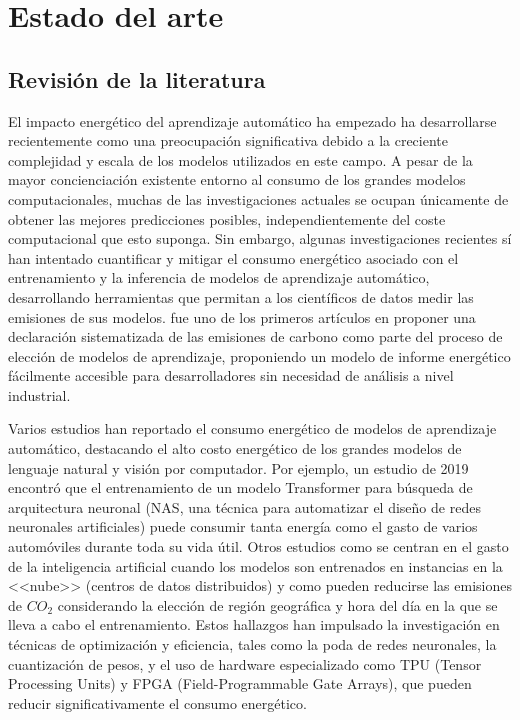 \chapter{Estado del arte}
\label{chap:sota}

\section{Revisión de la literatura}
\label{sec:lit-rev}


El impacto energético del aprendizaje automático ha empezado ha desarrollarse recientemente como una preocupación significativa debido a la creciente complejidad y escala de los modelos utilizados en este campo. A pesar de la mayor concienciación existente entorno al consumo de los grandes modelos computacionales, muchas de las investigaciones actuales se ocupan únicamente de obtener las mejores predicciones posibles, independientemente del coste computacional que esto suponga. Sin embargo, algunas investigaciones recientes sí han intentado cuantificar y mitigar el consumo energético asociado con el entrenamiento y la inferencia de modelos de aprendizaje automático, desarrollando herramientas que permitan a los científicos de datos medir las emisiones de sus modelos. \cite{lottick2019} fue uno de los primeros artículos en proponer una declaración sistematizada de las emisiones de carbono como parte del proceso de elección de modelos de aprendizaje, proponiendo un modelo de informe energético fácilmente accesible para desarrolladores sin necesidad de análisis a nivel industrial.

Varios estudios han reportado el consumo energético de modelos de aprendizaje automático, destacando el alto costo energético de los grandes modelos de lenguaje natural y visión por computador. Por ejemplo, un estudio de 2019 \cite{strubell2019nlp} encontró que el entrenamiento de un modelo Transformer para búsqueda de arquitectura neuronal (NAS, una técnica para automatizar el diseño de redes neuronales artificiales) puede consumir tanta energía como el gasto de varios automóviles durante toda su vida útil. Otros estudios como \cite{dodge2022cloud} se centran en el gasto de la inteligencia artificial cuando los modelos son entrenados en instancias en la <<nube>> (centros de datos distribuidos) y como pueden reducirse las emisiones de $CO_2$ considerando la elección de región geográfica y hora del día en la que se lleva a cabo el entrenamiento. Estos hallazgos han impulsado la investigación en técnicas de optimización y eficiencia, tales como la poda de redes neuronales, la cuantización de pesos, y el uso de hardware especializado como TPU (Tensor Processing Units) y FPGA (Field-Programmable Gate Arrays), que pueden reducir significativamente el consumo energético.

